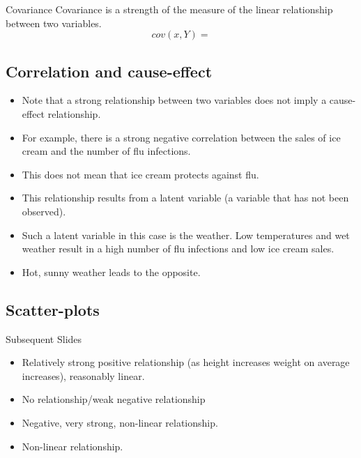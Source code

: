 \documentclass[]{report}
\begin{document}
%



{Covariance}
Covariance is a strength of the measure of the linear relationship between two variables.
\[ cov(x,Y) = \]




%








\subsection{Correlation and cause-effect}
\begin{itemize}
	\item Note that a strong relationship between two variables does not
	imply a cause-effect relationship.
	\item For example, there is a strong negative correlation between the
	sales of ice cream and the number of flu infections.
	\item This does not mean that ice cream protects against flu.
	\item This relationship results from a latent variable (a variable that has
	not been observed).
	\item Such a latent variable in this case is the weather. Low
	temperatures and wet weather result in a high number of flu
	infections and low ice cream sales. \item Hot, sunny weather leads to the
	opposite.
\end{itemize}





\subsection{Scatter-plots}
Subsequent Slides
\begin{itemize}
	\item Relatively strong positive relationship (as height increases
	weight on average increases), reasonably linear.
	\item No relationship/weak negative relationship
	\item Negative, very strong, non-linear relationship.
	\item Non-linear relationship.
\end{itemize}
\end{document}
